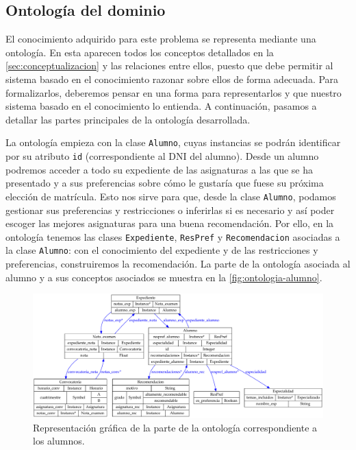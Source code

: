 
\subsection{Ontología del dominio} \label{sec:ontologia}

El conocimiento adquirido para este problema se representa mediante una
ontología. En esta aparecen todos los conceptos detallados en la
\autoref{sec:conceptualizacion} y las relaciones entre ellos, puesto que debe
permitir al sistema basado en el conocimiento razonar sobre ellos de forma
adecuada. Para formalizarlos, deberemos pensar en una forma para representarlos
y que nuestro sistema basado en el conocimiento lo entienda. A continuación, 
pasamos a detallar las partes principales de la ontología desarrollada.

La ontología empieza con la clase \texttt{Alumno}, cuyas instancias se podrán 
identificar por su atributo \texttt{id} (correspondiente al DNI del alumno).
Desde un alumno podremos acceder a todo su expediente de las asignaturas a las
que se ha presentado y a sus preferencias sobre cómo le gustaría que fuese su
próxima elección de matrícula. Esto nos sirve para que, desde la clase 
\texttt{Alumno}, podamos gestionar sus preferencias y restricciones o 
inferirlas si es necesario y así poder escoger las mejores asignaturas para 
una buena recomendación. Por ello, en la ontología tenemos las clases 
\texttt{Expediente}, \texttt{ResPref} y \texttt{Recomendacion} asociadas a 
la clase \texttt{Alumno}: con el conocimiento del expediente y de las 
restricciones y preferencias, construiremos la recomendación.
La parte de la ontología asociada al alumno y a sus 
conceptos asociados se muestra en la \autoref{fig:ontologia-alumno}.

\begin{figure}[ht]
    \centering
    \includegraphics[width=15cm]{ontologia-alumno}
    \caption{Representación gráfica de la parte de la ontología 
        correspondiente a los alumnos.}
    \label{fig:ontologia-alumno}
\end{figure}

